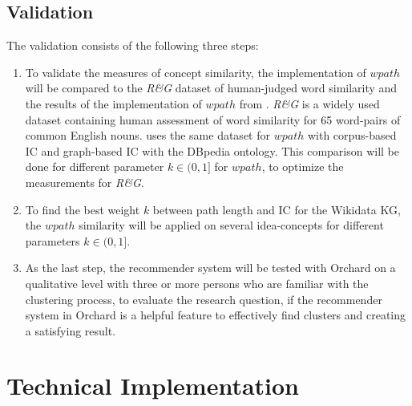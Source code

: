 \documentclass[pdftex,a4paper,12pt]{scrartcl}
\theoremstyle{definition}
\begin{document}
    \subsection{Validation}
    The validation consists of the following three steps:  
    \begin{enumerate}
        \item To validate the measures of concept similarity, the implementation of $wpath$ will be compared to the \textit{R\&G} dataset \citep{rubenstein_contextual_1965} of human-judged word similarity and the results of the implementation of $wpath$ from \citet{zhu_computing_2017}. \textit{R\&G} is a widely used dataset containing human assessment of word similarity for 65 word-pairs of common English nouns.
        \citet{zhu_computing_2017} uses the same dataset for $wpath$ with corpus-based IC and graph-based IC with the DBpedia ontology. This comparison will be done for different parameter $k \in (0,1]$ for $wpath$, to optimize the measurements for \textit{R\&G}. 
        \item To find the best weight $k$ between path length and IC for the Wikidata KG, the $wpath$ similarity will be applied on several idea-concepts for different parameters $k \in (0,1]$.
        \item  As the last step, the recommender system will be tested with Orchard on a qualitative level with three or more persons who are familiar with the clustering process, to evaluate the research question, if the recommender system in Orchard is a helpful feature to effectively find clusters and creating a satisfying result. 
    \end{enumerate}
    
    
    
   
    
    
    
    
    

\section{Technical Implementation}
    
\end{document}
